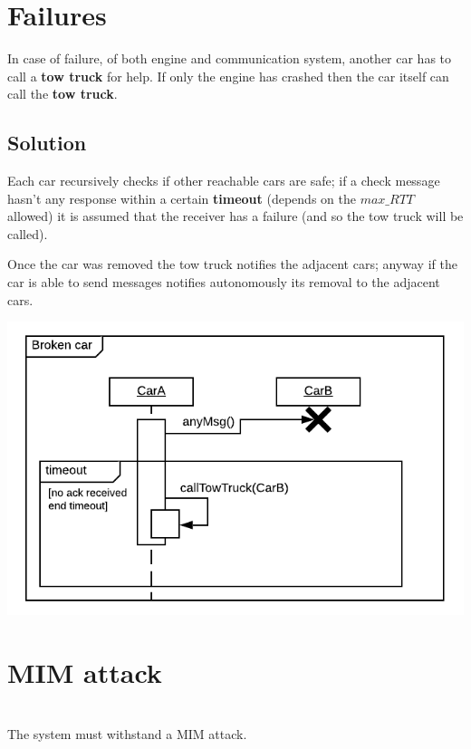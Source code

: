 \section{Failures}

In case of failure, of both engine and communication system,
another car has to call a \textbf{tow truck} for help. 
If only the engine has crashed then the car
itself can call the \textbf{tow truck}.


\subsection{Solution}

Each car recursively checks if other reachable cars are safe; if a check message
hasn't any response within a certain \textbf{timeout} (depends on the $max\_RTT$ allowed) 
it is assumed that the receiver has a failure (and so the tow truck will be called). 

Once the car was removed the tow truck notifies the adjacent cars; anyway if the car
is able to send messages notifies autonomously its removal to the adjacent cars.


\begin{center}
    \includegraphics[scale=0.9]{assets/ds2019_4.png}
\end{center}


\section{MIM attack}
\\

\noindent
The system must withstand a MIM attack.


